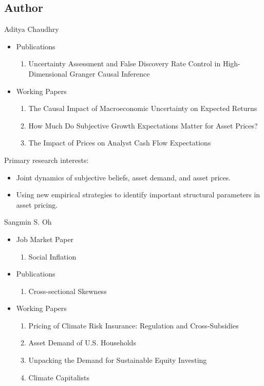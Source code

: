 \documentclass[UTF8, 16pt]{beamer}
\begin{document}
\begin{CJK*}{UTF8}{gbsn}
\section{Author}
\begin{frame}{Aditya Chaudhry}
	\begin{itemize}
		\item Publications
			\begin{enumerate}
				\item Uncertainty Assessment and False Discovery Rate Control in High-Dimensional Granger Causal Inference
			\end{enumerate}
		\item Working Papers
			\begin{enumerate}
				\item The Causal Impact of \alert{Macroeconomic Uncertainty} on Expected Returns
				\item How Much Do \alert{Subjective Growth Expectations} Matter for Asset Prices?
				\item The Impact of Prices on \alert{Analyst Cash Flow Expectations}
			\end{enumerate}
	\end{itemize}
	Primary research interests:
	\begin{itemize}
		\item Joint dynamics of \alert{subjective beliefs}, asset demand, and asset prices.
		\item Using \alert{new empirical strategies} to identify important structural parameters in asset pricing.
	\end{itemize}
\end{frame}
\begin{frame}{Sangmin S. Oh}
	\begin{itemize}
		\item Job Market Paper
			\begin{enumerate}
				\item Social Inflation
			\end{enumerate}
		\item Publications
			\begin{enumerate}
				\item Cross-sectional Skewness
			\end{enumerate}
		\item Working Papers
			\begin{enumerate}
				\item Pricing of Climate Risk Insurance: Regulation and Cross-Subsidies
				\item Asset Demand of U.S. Households
				\item Unpacking the Demand for Sustainable Equity Investing
				\item Climate Capitalists
			\end{enumerate}
	\end{itemize}
	

\end{frame}
\end{CJK*}
\end{document}
